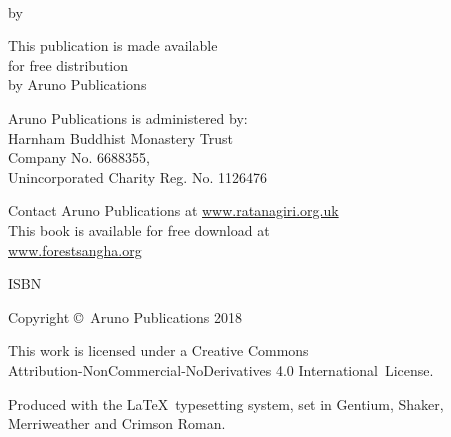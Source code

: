 \cleartoverso
\thispagestyle{empty}

{\copyrightsize
\centering
\setlength{\parindent}{0pt}%
\setlength{\parskip}{0.8\baselineskip}%

\thetitle\\
by \theauthor

This publication is made available\\
for free distribution\\
by Aruno Publications

Aruno Publications is administered by:\\
Harnham Buddhist Monastery Trust\\
Company No. 6688355,\\
Unincorporated Charity Reg. No. 1126476

Contact Aruno Publications at \href{https://ratanagiri.org.uk/}{www.ratanagiri.org.uk}\\
This book is available for free download at\\
\href{https://forestsangha.org/}{www.forestsangha.org}

ISBN \theISBN

Copyright \copyright\ Aruno Publications 2018

\vfill

{\footnotesize

This work is licensed under a Creative Commons\\
Attribution-NonCommercial-NoDerivatives 4.0 International~License.

Produced with the \LaTeX\ typesetting system, set in Gentium, Shaker,\\
Merriweather and Crimson Roman.

\theEditionInfo

}}
